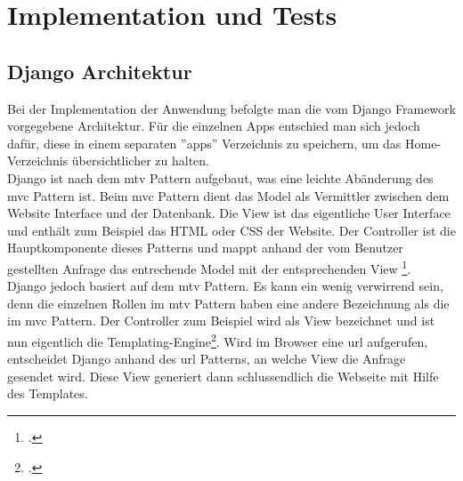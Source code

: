 \section{Implementation und Tests}
\subsection{Django Architektur}
Bei der Implementation der Anwendung befolgte man die vom Django Framework vorgegebene Architektur. Für die einzelnen Apps entschied man sich jedoch dafür, diese in einem separaten ''apps'' Verzeichnis zu speichern, um das Home-Verzeichnis übersichtlicher zu halten.\\

Django ist nach dem \gls{mtv} Pattern aufgebaut, was eine leichte Abänderung des \gls{mvc} Pattern ist. Beim \gls{mvc} Pattern dient das Model als Vermittler zwischen dem Website Interface und der Datenbank. Die View ist das eigentliche User Interface und enthält zum Beispiel das HTML oder CSS der Website. Der Controller ist die Hauptkomponente dieses Patterns und mappt anhand der vom Benutzer gestellten Anfrage das entrechende Model mit der entsprechenden View \footcite{django_mvc}. \\

Django jedoch basiert auf dem \gls{mtv} Pattern. Es kann ein wenig verwirrend sein, denn die einzelnen Rollen im \gls{mtv} Pattern haben eine andere Bezeichnung als die im \gls{mvc} Pattern. Der Controller zum Beispiel wird als View bezeichnet und ist nun eigentlich die Templating-Engine\footcite{django_architektur}. Wird im Browser eine \gls{url} aufgerufen, entscheidet Django anhand des \gls{url} Patterns, an welche View die Anfrage gesendet wird. Diese View generiert dann schlussendlich die Webseite mit Hilfe des Templates. \\


